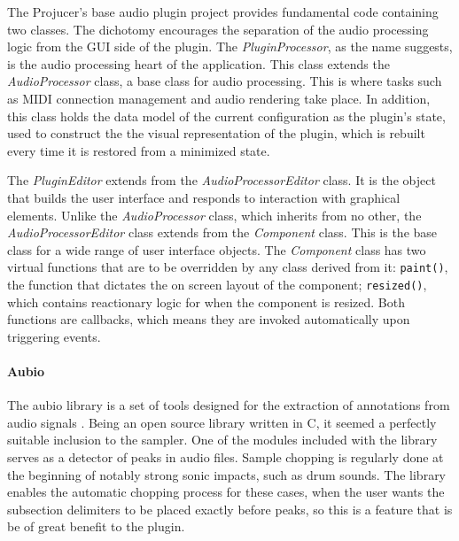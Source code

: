 \documentclass[12pt, a4paper, hidelinks]{report}
\begin{document}
	The Projucer's base audio plugin project provides fundamental code containing two classes. The dichotomy encourages the separation of the audio processing logic from the GUI side of the plugin. The \textit{PluginProcessor}, as the name suggests, is the audio processing heart of the application. This class extends the \textit{AudioProcessor} class, a base class for audio processing. This is where tasks such as MIDI connection management and audio rendering take place. In addition, this class holds the data model of the current configuration as the plugin's state, used to construct the the visual representation of the plugin, which is rebuilt every time it is restored from a minimized state.\par
	The \textit{PluginEditor} extends from the \textit{AudioProcessorEditor} class. It is the object that builds the user interface and responds to interaction with graphical elements. Unlike the \textit{AudioProcessor} class, which inherits from no other, the \textit{AudioProcessorEditor} class extends from the \textit{Component} class. This is the base class for a wide range of user interface objects. The \textit{Component} class has two virtual functions that are to be overridden by any class derived from it: \texttt{paint()}, the function that dictates the on screen layout of the component; \texttt{resized()}, which contains reactionary logic for when the component is resized. Both functions are callbacks, which means they are invoked automatically upon triggering events.\par 
	
	
	\paragraph{Aubio\\}
	The aubio library is a set of tools designed for the extraction of annotations from audio signals \cite{aubio}. Being an open source library written in C, it seemed a perfectly suitable inclusion to the sampler. One of the modules included with the library serves as a detector of peaks in audio files. Sample chopping is regularly done at the beginning of notably strong sonic impacts, such as drum sounds. The library enables the automatic chopping process for these cases, when the user wants the subsection delimiters to be placed exactly before peaks, so this is a feature that is be of great benefit to the plugin.
	
\end{document}
